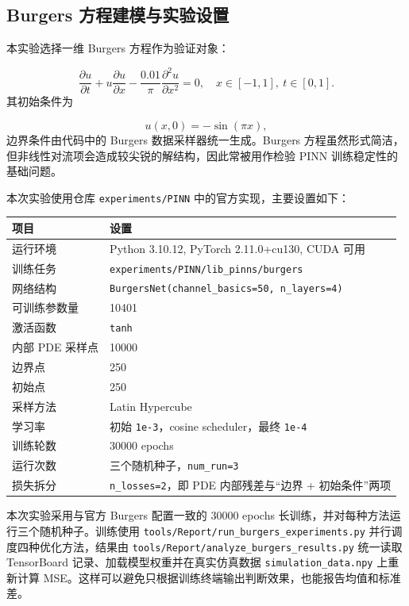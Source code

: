 \documentclass[UTF8,a4paper,12pt,fontset=none]{ctexart}
\begin{document}
\subsection{Burgers 方程建模与实验设置}

本实验选择一维 Burgers 方程作为验证对象：

\[
\frac{\partial u}{\partial t}+u\frac{\partial u}{\partial x}-\frac{0.01}{\pi}\frac{\partial^2 u}{\partial x^2}=0,\quad x\in[-1,1],\ t\in[0,1].
\]
其初始条件为

\[
u(x,0)=-\sin(\pi x),
\]
边界条件由代码中的 Burgers 数据采样器统一生成。Burgers 方程虽然形式简洁，但非线性对流项会造成较尖锐的解结构，因此常被用作检验 PINN 训练稳定性的基础问题。


本次实验使用仓库 \texttt{experiments/PINN} 中的官方实现，主要设置如下：


\begingroup
\small
\begin{longtable}{p{}p{}}
\toprule
项目 & 设置 \\
\midrule
运行环境 & Python 3.10.12, PyTorch 2.11.0+cu130, CUDA 可用 \\
训练任务 & \texttt{experiments/PINN/lib\_pinns/burgers} \\
网络结构 & \texttt{BurgersNet(channel\_basics=50, n\_layers=4)} \\
可训练参数量 & 10401 \\
激活函数 & \texttt{tanh} \\
内部 PDE 采样点 & 10000 \\
边界点 & 250 \\
初始点 & 250 \\
采样方法 & Latin Hypercube \\
学习率 & 初始 \texttt{1e-3}，cosine scheduler，最终 \texttt{1e-4} \\
训练轮数 & 30000 epochs \\
运行次数 & 三个随机种子，\texttt{num\_run=3} \\
损失拆分 & \texttt{n\_losses=2}，即 PDE 内部残差与“边界 + 初始条件”两项 \\
\bottomrule
\end{longtable}
\endgroup


本次实验采用与官方 Burgers 配置一致的 30000 epochs 长训练，并对每种方法运行三个随机种子。训练使用 \texttt{tools/Report/run\_burgers\_experiments.py} 并行调度四种优化方法，结果由 \texttt{tools/Report/analyze\_burgers\_results.py} 统一读取 TensorBoard 记录、加载模型权重并在真实仿真数据 \texttt{simulation\_data.npy} 上重新计算 MSE。这样可以避免只根据训练终端输出判断效果，也能报告均值和标准差。
\end{document}
